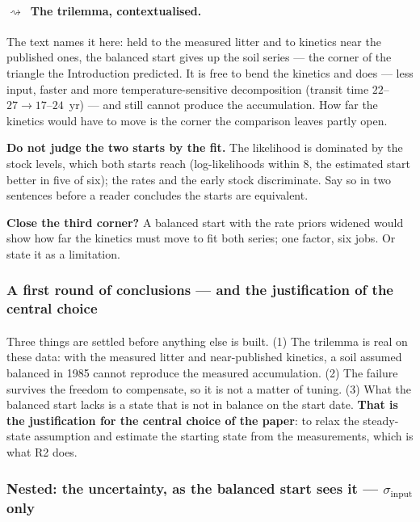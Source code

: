 \documentclass[11pt]{article}
\newcommand{\sinput}{\sigma_{\mathrm{input}}}
\newcommand{\dparagraph}[1]{\paragraph{\textcolor{noterule}{$\rightsquigarrow$}\ #1}}
\begin{document}
\dparagraph{The trilemma, contextualised.} The text names it here: held to the measured litter and to
kinetics near the published ones, the balanced start gives up the soil series --- the corner of the triangle
the Introduction predicted. It is free to bend the kinetics and does
--- less input, faster and more temperature-sensitive decomposition (transit time $22$--$27 \to 17$--$24$~yr)
--- and still cannot produce the accumulation. How far the kinetics would have to move is the corner the
comparison leaves partly open.
\begin{warn}
\textbf{Do not judge the two starts by the fit.} The likelihood is dominated by the stock levels, which both
starts reach (log-likelihoods within $8$, the estimated start better in five of six); the rates and the early stock discriminate. Say so in two
sentences before a reader concludes the starts are equivalent.
\end{warn}
\begin{test}
\textbf{Close the third corner?} A balanced start with the rate priors widened would show how far the
kinetics must move to fit both series; one factor, six jobs. Or state it as a limitation.
\end{test}

\subsubsection{A first round of conclusions --- and the justification of the central choice}
\paragraph{} Three things are settled before anything else is built. (1) The trilemma is real on these data:
with the measured litter and near-published kinetics, a soil assumed balanced in 1985 cannot reproduce the
measured accumulation. (2) The failure survives the freedom to compensate, so it is not a matter of tuning.
(3) What the balanced start lacks is a state that is not in balance on the start date. \textbf{That is the
justification for the central choice of the paper}: to relax the steady-state assumption and estimate the
starting state from the measurements, which is what R2 does.

\subsubsection{Nested: the uncertainty, as the balanced start sees it --- $\sinput$ only}
\end{document}
